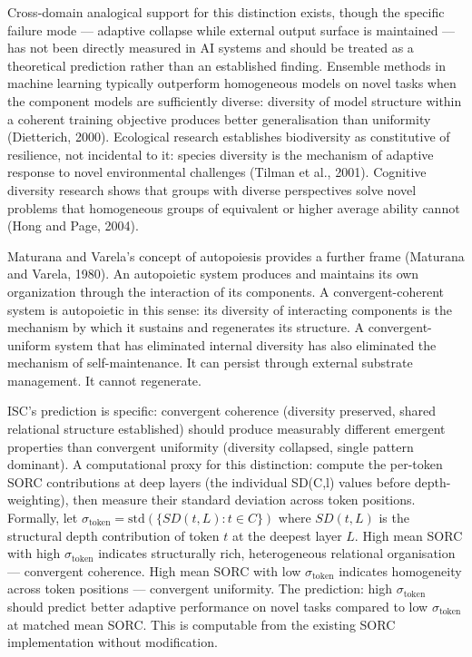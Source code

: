 \documentclass[12pt]{article}
\begin{document}
Cross-domain analogical support for this distinction exists, though the
specific failure mode --- adaptive collapse while external output
surface is maintained --- has not been directly measured in AI systems
and should be treated as a theoretical prediction rather than an
established finding. Ensemble methods in machine learning typically
outperform homogeneous models on novel tasks when the component models
are sufficiently diverse: diversity of model structure within a coherent
training objective produces better generalisation than uniformity
(Dietterich, 2000). Ecological research establishes biodiversity as
constitutive of resilience, not incidental to it: species diversity is
the mechanism of adaptive response to novel environmental challenges
(Tilman et al., 2001). Cognitive diversity research shows that groups
with diverse perspectives solve novel problems that homogeneous groups
of equivalent or higher average ability cannot (Hong and Page, 2004).

Maturana and Varela's concept of autopoiesis provides a further frame
(Maturana and Varela, 1980). An autopoietic system produces and
maintains its own organization through the interaction of its
components. A convergent-coherent system is autopoietic in this sense:
its diversity of interacting components is the mechanism by which it
sustains and regenerates its structure. A convergent-uniform system that
has eliminated internal diversity has also eliminated the mechanism of
self-maintenance. It can persist through external substrate management.
It cannot regenerate.

ISC's prediction is specific: convergent coherence (diversity preserved,
shared relational structure established) should produce measurably
different emergent properties than convergent uniformity (diversity
collapsed, single pattern dominant). A computational proxy for this
distinction: compute the per-token SORC contributions at deep layers
(the individual SD(C,l) values before depth-weighting), then measure
their standard deviation across token positions. Formally, let
$\sigma_{\text{token}} = \text{std}(\{SD(t,L) : t \in C\})$ where
$SD(t,L)$ is the structural depth contribution of token $t$ at the
deepest layer $L$. High mean SORC with high $\sigma_{\text{token}}$
indicates structurally rich, heterogeneous relational organisation ---
convergent coherence. High mean SORC with low $\sigma_{\text{token}}$
indicates homogeneity across token positions --- convergent uniformity.
The prediction: high $\sigma_{\text{token}}$ should predict better
adaptive performance on novel tasks compared to low
$\sigma_{\text{token}}$ at matched mean SORC. This is computable from
the existing SORC implementation without modification.
\end{document}
